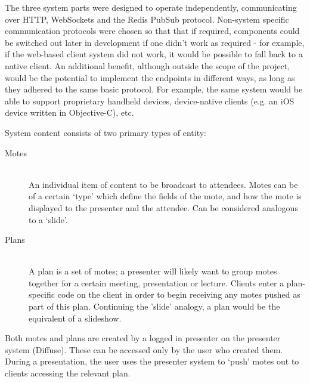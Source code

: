 \documentclass[a4papert,11pt,notitlepage]{ltxdoc}
\begin{document}
The three system parts were designed to operate independently, communicating over HTTP, WebSockets and the Redis PubSub protocol. Non-system specific communication protocols were chosen so that that if required, components could be switched out later in development if one didn't work as required - for example, if the web-based client system did not work, it would be possible to fall back to a native client. An additional benefit, although outside the scope of the project, would be the potential to implement the endpoints in different ways, as long as they adhered to the same basic protocol. For example, the same system would be able to support proprietary handheld devices, device-native clients (e.g. an iOS device written in Objective-C), etc.

System content consists of two primary types of entity:
\begin{description}
\item[Motes] \hfill \\
An individual item of content to be broadcast to attendees. Motes can be of a certain `type' which define the fields of the mote, and how the mote is displayed to the presenter and the attendee. Can be considered analogous to a `slide'.
\item[Plans] \hfill \\
A plan is a set of motes; a presenter will likely want to group motes together for a certain meeting, presentation or lecture. Clients enter a plan-specific code on the client in order to begin receiving any motes pushed as part of this plan. Continuing the 'slide' analogy, a plan would be the equivalent of a slideshow.
\end{description}

Both motes and plans are created by a logged in presenter on the presenter system (Diffuse). These can be accessed only by the user who created them. During a presentation, the user uses the presenter system to `push' motes out to clients accessing the relevant plan.
\end{document}
